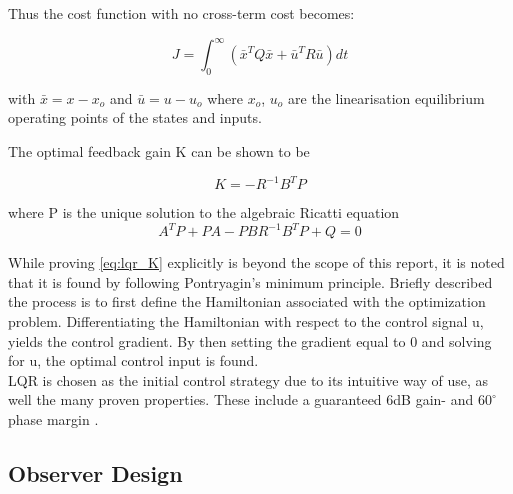 Thus the cost function with no cross-term cost becomes:

\begin{equation} \label{eq:lqr_cost_fcn}
	J = \int_0^{\infty} \left( \bar{x}^TQ\bar{x} + \bar{u}^TR\bar{u} \right)dt
\end{equation}

with $\bar{x} = x-x_o$ and $\bar{u} = u-u_o$ where $x_o$, $u_o$ are the linearisation equilibrium operating points of the states and inputs.

The optimal feedback gain K can be shown to be

\begin{equation} \label{eq:lqr_K}
	K = -R^{-1}B^{T}P
\end{equation}

where P is the unique solution to the algebraic Ricatti equation
\begin{equation} \label{eq:ricatti}
	A^TP + PA - PBR^{-1}B^TP+Q = 0
\end{equation}

While proving \cref{eq:lqr_K} explicitly is beyond the scope of this report, it is noted that it is found by following Pontryagin's minimum principle. Briefly described the process is to first define the Hamiltonian associated with the optimization problem. Differentiating the Hamiltonian with respect to the control signal u, yields the control gradient. By then setting the gradient equal to 0 and solving for u, the optimal control input is found.
\\


LQR is chosen as the initial control strategy due to its intuitive way of use, as well the many proven properties. These include a guaranteed 6dB gain- and $60^\circ$ phase margin \cite{Doyle}.

\subsection{Observer Design}

